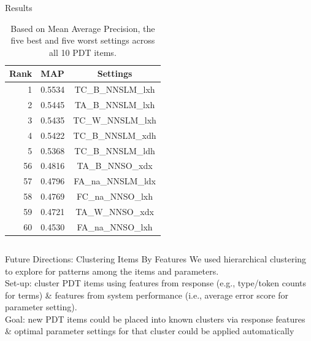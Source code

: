 \documentclass[final,t]{beamer}
\begin{document}
\begin{frame}{}
\begin{columns}[t]
\begin{column}{.64\linewidth}
\begin{columns}
\begin{column}{.49\linewidth}
\begin{block}{Results}
\begin{multicols}{2}
\begin{table}[htb!]
\begin{center}
\begin{tabular}{|r|l|c|}
 \hline
 Rank & MAP & Settings \\
 \hline
 \hline
1 & 0.5534 & TC\_B\_NNSLM\_lxh \\
\hline
2 & 0.5445 & TA\_B\_NNSLM\_lxh \\
\hline
3 & 0.5435 & TC\_W\_NNSLM\_lxh \\
\hline
4 & 0.5422 & TC\_B\_NNSLM\_xdh \\
\hline
5 & 0.5368 & TC\_B\_NNSLM\_ldh \\
 \hline
 \hline
56 & 0.4816 & TA\_B\_NNSO\_xdx \\
\hline
57 & 0.4796 & FA\_na\_NNSLM\_ldx \\
\hline
58 & 0.4769 & FC\_na\_NNSO\_lxh \\
\hline
59 & 0.4721 & TA\_W\_NNSO\_xdx \\
\hline
60 & 0.4530 & FA\_na\_NNSO\_lxh \\
\hline
\end{tabular}
\begin{minipage}{.86\columnwidth}
\vspace{.7em}
\caption{Based on Mean Average Precision, the five best and five worst settings across all 10 PDT items.}
\label{tab:all-dist-ranked-settings}
\end{minipage}
\end{center}
\end{table}

\end{multicols}

\end{block}

\end{column}
\end{columns}

\begin{block}{Future Directions: Clustering Items By Features}
We used hierarchical clustering to explore for patterns among the items and parameters.\\
\mbox{}\hfill Set-up: cluster PDT items using features from response (e.g., type/token counts for terms) \& features from system performance (i.e., average error score for parameter setting).\hfill\mbox{}
\\\mbox{}\hfill Goal: new PDT items could be placed into known clusters via response features \& optimal parameter settings for that cluster could be applied automatically\\ %


\end{block}
\end{column}
\end{columns}
\end{frame}
\end{document}
